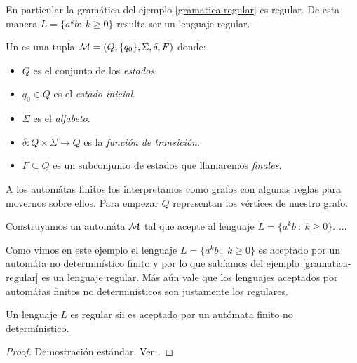 \documentclass[tesis.tex]{subfiles}
\begin{document}
En particular la gramática del ejemplo \ref{gramatica-regular} es regular. 
De esta manera $L= \{ a^k b : \ k \ge 0  \}$ resulta ser un lenguaje regular.


\begin{deff}
	Un  es una tupla ${\cal M} = (Q,\{q_0\},\Sigma,\delta,F)$ donde:
	\begin{itemize}
	\item $Q$ es el conjunto de los \emph{estados}.
	\item $q_0 \in Q$ es el \emph{estado inicial}.
	\item $\Sigma$ es el \emph{alfabeto}.
	\item $\delta:Q \times \Sigma \to Q$ es la \emph{función de transición}.
	\item $F \subseteq Q$ es un subconjunto de estados que llamaremos \emph{finales}.
	\end{itemize}
\end{deff}

A los automátas finitos los interpretamos como grafos con algunas reglas para movernos sobre ellos. 
Para empezar $Q$ representan los vértices de nuestro grafo.

\begin{ej}
	Construyamos un automáta $\cal M$ tal que acepte al lenguaje $L = \{ a^kb \ : \ k \ge 0  \}$.
	...
\end{ej}


Como vimos en este ejemplo el lenguaje $L = \{ a^kb \ : \ k \ge 0  \}$ es aceptado por un automáta no determinístico finito y por lo que sabíamos del ejemplo \ref{gramatica-regular} es un lenguaje regular.
Más aún vale que los lenguajes aceptados por automátas finitos no determinísticos son justamente los regulares.

\begin{teo}
 Un lenguaje $L$ es regular sii es aceptado por un autómata finito no determínistico.
\end{teo}

\begin{proof}
	Demostración estándar. Ver \cite{hopcraft-ullman}.
\end{proof}




\end{document}
